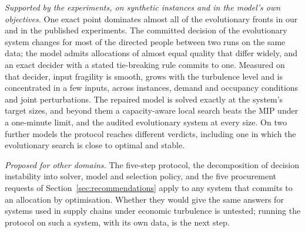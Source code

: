 \documentclass[systems,article,submit,moreauthors,pdftex]{Definitions/mdpi}
\begin{document}
\emph{Supported by the experiments, on synthetic instances and in the model's own objectives.} One
exact point dominates almost all of the evolutionary fronts in our and in the published
experiments. The committed decision of the evolutionary system changes for most of the directed
people between two runs on the same data; the model admits allocations of almost equal quality
that differ widely, and an exact decider with a stated tie-breaking rule commits to one. Measured
on that decider, input fragility is smooth, grows with the turbulence level and is concentrated in
a few inputs, across instances, demand and occupancy conditions and joint perturbations. The
repaired model is solved exactly at the system's target sizes, and beyond them a capacity-aware
local search beats the MIP under a one-minute limit, and the audited evolutionary system at every
size. On two
further models the protocol reaches different verdicts, including one in which the evolutionary
search is close to optimal and stable.

\emph{Proposed for other domains.} The five-step protocol, the decomposition of decision
instability into solver, model and selection policy, and the five procurement requests of
Section~\ref{sec:recommendations} apply to any system that commits to an allocation by
optimisation. Whether they would give the same answers for systems used in supply chains under
economic turbulence is untested; running the protocol on such a system, with its own data, is the
next step.

\appendix
\end{document}
